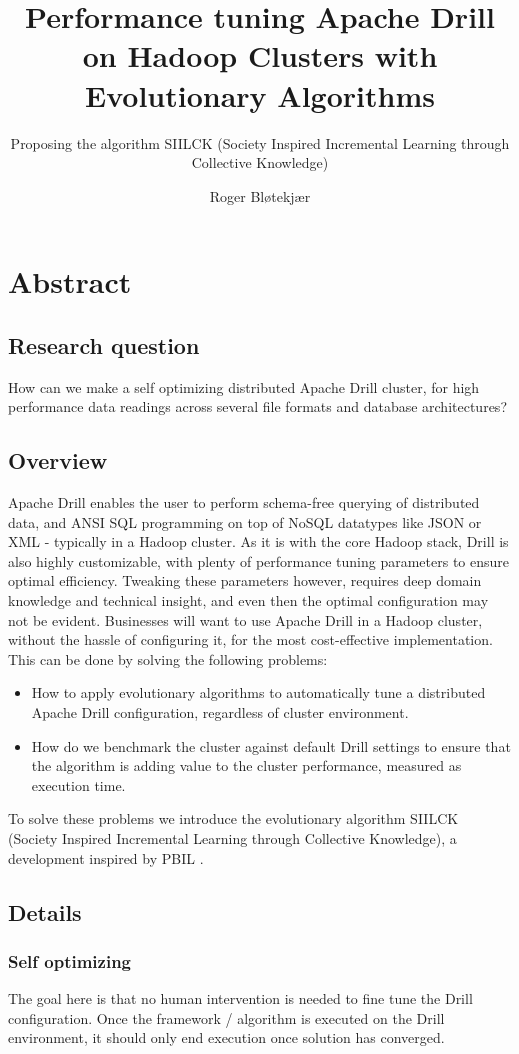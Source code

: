 \documentclass[a4paper,english]{report}
\title{Performance tuning Apache Drill on Hadoop Clusters with Evolutionary Algorithms}
\subtitle{Proposing the algorithm SIILCK (Society Inspired Incremental Learning through Collective Knowledge)}
\author{Roger Bløtekjær}
\begin{document}
	\duoforside[dept={Institutt for informatikk},
	program={Informatikk: språkteknologi},
	short]
	\section{Abstract}
		\subsection{Research question}
		How can we make a self optimizing distributed Apache Drill cluster, for high performance data readings across several file formats and database architectures?
		\subsection{Overview}
		Apache Drill enables the user to perform schema-free querying of distributed data, and ANSI SQL programming on top of NoSQL datatypes like JSON or XML - typically in a Hadoop cluster. As it is with the core Hadoop stack, Drill is also highly customizable, with plenty of performance tuning parameters to ensure optimal efficiency. Tweaking these parameters however, requires deep domain knowledge and technical insight, and even then the optimal configuration may not be evident. Businesses will want to use Apache Drill in a Hadoop cluster, without the hassle of configuring it, for the most cost-effective implementation. This can be done by solving the following problems:
		\begin{itemize}
			\item How to apply evolutionary algorithms to automatically tune a distributed Apache Drill configuration, regardless of cluster environment.
			\item How do we benchmark the cluster against default Drill settings to ensure that the algorithm is adding value to the cluster performance, measured as execution time.
		\end{itemize}
		To solve these problems we introduce the evolutionary algorithm SIILCK (Society Inspired Incremental Learning through Collective Knowledge), a development inspired by PBIL \cite{pbil}.
		\subsection{Details}
			\subsubsection{Self optimizing}
			The goal here is that no human intervention is needed to fine tune the Drill configuration. Once the framework / algorithm is executed on the Drill environment, it should only end execution once solution has converged.
\end{document}
